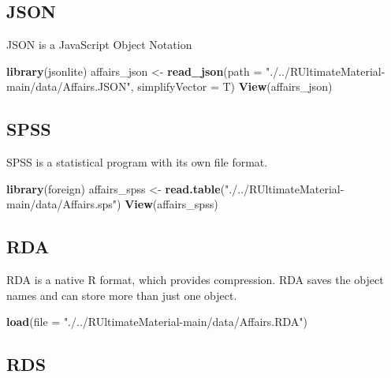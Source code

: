 \documentclass[
]{article}
\newenvironment{Shaded}{\begin{snugshade}}{\end{snugshade}}
\newcommand{\AttributeTok}[1]{\textcolor[rgb]{0.13,0.29,0.53}{#1}}
\newcommand{\FunctionTok}[1]{\textcolor[rgb]{0.13,0.29,0.53}{\textbf{#1}}}
\newcommand{\NormalTok}[1]{#1}
\newcommand{\OtherTok}[1]{\textcolor[rgb]{0.56,0.35,0.01}{#1}}
\newcommand{\StringTok}[1]{\textcolor[rgb]{0.31,0.60,0.02}{#1}}
\begin{document}
\subsection{JSON}\label{json}

JSON is a JavaScript Object Notation

\begin{Shaded}
\begin{Highlighting}[]
\FunctionTok{library}\NormalTok{(jsonlite)}
\NormalTok{affairs\_json }\OtherTok{\textless{}{-}} \FunctionTok{read\_json}\NormalTok{(}\AttributeTok{path =} \StringTok{"./../RUltimateMaterial{-}main/data/Affairs.JSON"}\NormalTok{, }\AttributeTok{simplifyVector =}\NormalTok{ T)}
\FunctionTok{View}\NormalTok{(affairs\_json)}
\end{Highlighting}
\end{Shaded}

\subsection{SPSS}\label{spss}

SPSS is a statistical program with its own file format.

\begin{Shaded}
\begin{Highlighting}[]
\FunctionTok{library}\NormalTok{(foreign)}
\NormalTok{affairs\_spss }\OtherTok{\textless{}{-}} \FunctionTok{read.table}\NormalTok{(}\StringTok{"./../RUltimateMaterial{-}main/data/Affairs.sps"}\NormalTok{)}
\FunctionTok{View}\NormalTok{(affairs\_spss)}
\end{Highlighting}
\end{Shaded}

\subsection{RDA}\label{rda}

RDA is a native R format, which provides compression. RDA saves the
object names and can store more than just one object.

\begin{Shaded}
\begin{Highlighting}[]
\FunctionTok{load}\NormalTok{(}\AttributeTok{file =} \StringTok{"./../RUltimateMaterial{-}main/data/Affairs.RDA"}\NormalTok{)}
\end{Highlighting}
\end{Shaded}

\subsection{RDS}\label{rds}
\end{document}

